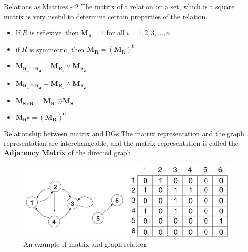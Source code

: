 \documentclass[xcolor=svgnames]{beamer}
\newcommand{\comment}[1]{}
\begin{document}
\begin{frame}{Relations as Matrices - 2}
    The matrix of a relation on a set, which is a \underline{square matrix} is very useful to determine certain properties of the relation.
    \begin{itemize}
        \item If $R$ is reflexive, then $\boldsymbol{M_{ii}} = 1$ for all $i = 1, 2, 3, \ldots, n$
        \item if $R$ is symmetric, then $\boldsymbol{M_R} = \boldsymbol{(M_R)^t}$
        \item $\boldsymbol{M_{R_1 \cup R_2}}  = \boldsymbol{M_{R_1}} \vee \boldsymbol{M_{R_2}}$
        \item $\boldsymbol{M_{R_1 \cap R_2}}  = \boldsymbol{M_{R_1}} \wedge \boldsymbol{M_{R_2}}$
        \item $\boldsymbol{M_{S \circ R}} = \boldsymbol{M_R} \odot \boldsymbol{M_S}$
        \item $\boldsymbol{M_{R^n}} = \boldsymbol{(M_R)^n}$
    \end{itemize}
\end{frame}

\comment{\begin{frame}{Relations as Directed Graphs}
    \begin{definition}
        A directed graph $G = (V, E)$ is defined as such with $V$ nodes and $E$ edges between the nodes. Directed graph implies that the edges are directional and have a starting node and terminating node. \\
        We may also represent a relation using directed graph. If there exists a relation $R$ between $A$ and $B$, all the nodes of the graph would be the elements from the set $A \cup B$. If $(a, b) \in R$, then there would be an edge from the node $a$ to node $b$ in the directed graph.
    \end{definition}
\end{frame}
}
\begin{frame}{Relationship between matrix and DGs}
    \centering
    The matrix representation and the graph representation are interchangeable, and the matrix representation is called the \textbf{\underline{Adjacency Matrix}} of the directed graph.
    \begin{figure}
        \includegraphics[width=0.95\linewidth]{A-directed-graph-represented-by-an-adjacency-matrix.png}
        \caption{An example of matrix and graph relation}
        \label{fig:my_label}
    \end{figure}
\end{frame}
\end{document}
